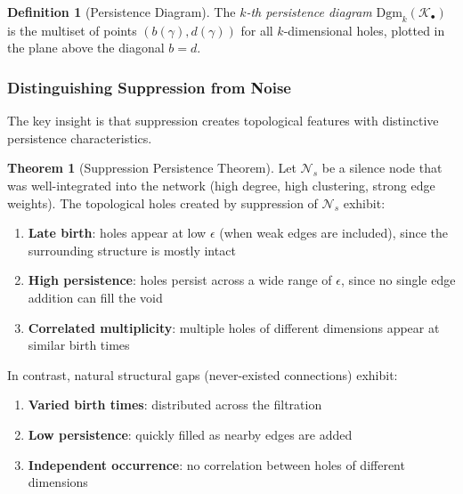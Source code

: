 \documentclass[12pt,a4paper]{article}
\theoremstyle{definition}
\newtheorem{definition}{Definition}[section]
\newtheorem{theorem}{Theorem}[section]
\theoremstyle{remark}
\newcommand{\NS}{\mathcal{N}_s}          %
\begin{document}
\begin{definition}[Persistence Diagram]
The \emph{$k$-th persistence diagram} $\text{Dgm}_k(\mathcal{K}_\bullet)$ is the multiset of points $(b(\gamma), d(\gamma))$ for all $k$-dimensional holes, plotted in the plane above the diagonal $b = d$.
\end{definition}

\subsubsection{Distinguishing Suppression from Noise}

The key insight is that suppression creates topological features with distinctive persistence characteristics.

\begin{theorem}[Suppression Persistence Theorem]
\label{thm:persistence}
Let $\NS$ be a silence node that was well-integrated into the network (high degree, high clustering, strong edge weights). The topological holes created by suppression of $\NS$ exhibit:
\begin{enumerate}
    \item \textbf{Late birth}: holes appear at low $\epsilon$ (when weak edges are included), since the surrounding structure is mostly intact
    \item \textbf{High persistence}: holes persist across a wide range of $\epsilon$, since no single edge addition can fill the void
    \item \textbf{Correlated multiplicity}: multiple holes of different dimensions appear at similar birth times
\end{enumerate}

In contrast, natural structural gaps (never-existed connections) exhibit:
\begin{enumerate}
    \item \textbf{Varied birth times}: distributed across the filtration
    \item \textbf{Low persistence}: quickly filled as nearby edges are added
    \item \textbf{Independent occurrence}: no correlation between holes of different dimensions
\end{enumerate}
\end{theorem}
\end{document}
